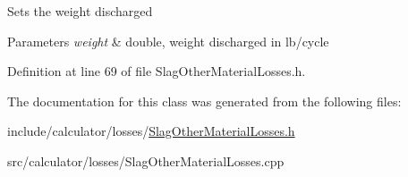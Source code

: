 Sets the weight discharged 
\begin{DoxyParams}{Parameters}
{\em weight} & double, weight discharged in lb/cycle \\
\hline
\end{DoxyParams}


Definition at line 69 of file Slag\+Other\+Material\+Losses.\+h.



The documentation for this class was generated from the following files\+:\begin{DoxyCompactItemize}
\item 
include/calculator/losses/\hyperlink{_slag_other_material_losses_8h}{Slag\+Other\+Material\+Losses.\+h}\item 
src/calculator/losses/Slag\+Other\+Material\+Losses.\+cpp\end{DoxyCompactItemize}
